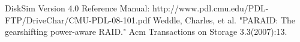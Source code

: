 \documentclass[conference]{IEEEtran}
\begin{document}
%
%
%
\begin{thebibliography}{1}

    DiskSim Version 4.0 Reference Manual: http://www.pdl.cmu.edu/PDL-FTP/DriveChar/CMU-PDL-08-101.pdf
	Weddle, Charles, et al. "PARAID: The gearshifting power-aware RAID." Acm Transactions on Storage 3.3(2007):13.
\end{thebibliography}




\end{document}
